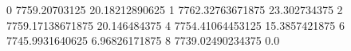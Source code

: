 0 7759.20703125 20.18212890625
1 7762.32763671875 23.302734375
2 7759.17138671875 20.146484375
4 7754.41064453125 15.3857421875
6 7745.9931640625 6.96826171875
8 7739.02490234375 0.0
